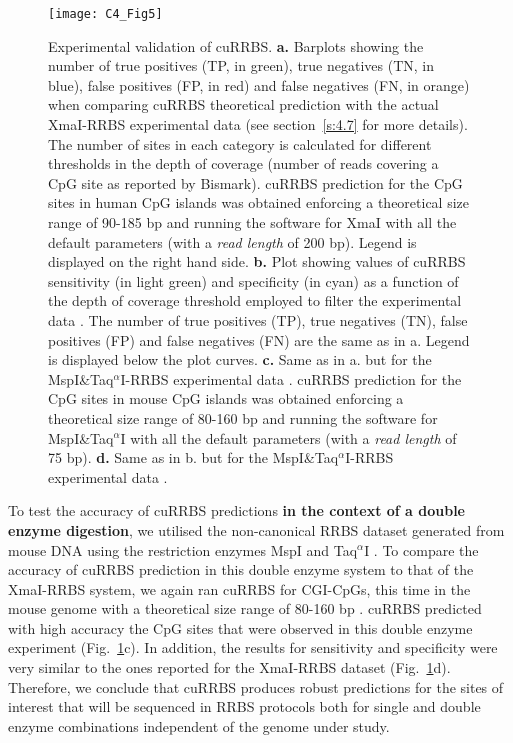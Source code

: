 \begin{figure}[htbp!] 
	\centering    
	\texttt{[image: C4\_Fig5]}
	\vspace*{2mm}
	\caption[Experimental validation of cuRRBS]{Experimental validation of cuRRBS. \textbf{a.} Barplots showing the number of true positives (\acrshort{TP}, in green), true negatives (\acrshort{TN}, in blue), false positives (\acrshort{FP}, in red) and false negatives (\acrshort{FN}, in orange) when comparing cuRRBS theoretical prediction with the actual XmaI-RRBS experimental data \cite{Tanas2017} (see section~\ref{s:4.7} for more details). The number of sites in each category is calculated for different thresholds in the depth of coverage (number of reads covering a CpG site as reported by Bismark). cuRRBS prediction for the CpG sites in human CpG islands was obtained enforcing a theoretical size range of 90-185 bp and running the software for XmaI with all the default parameters (with a \textit{read length} of 200 bp). Legend is displayed on the right hand side. \textbf{b.} Plot showing values of cuRRBS sensitivity (in light green) and specificity (in cyan) as a function of the depth of coverage threshold employed to filter the experimental data \cite{Tanas2017}. The number of true positives (TP), true negatives (TN), false positives (FP) and false negatives (FN) are the same as in a. Legend is displayed below the plot curves. \textbf{c.} Same as in a. but for the MspI\&Taq$^\alpha$I-RRBS experimental data \cite{Lim2016}. cuRRBS prediction for the CpG sites in mouse CpG islands was obtained enforcing a theoretical size range of 80-160 bp and running the software for MspI\&Taq$^\alpha$I with all the default parameters (with a \textit{read length} of 75 bp). \textbf{d.} Same as in b. but for the MspI\&Taq$^\alpha$I-RRBS experimental data \cite{Lim2016}.}
	\label{fig:c4_fig5}
\end{figure}

\bigskip

To test the accuracy of cuRRBS predictions \textbf{in the context of a double enzyme digestion}, we utilised the non-canonical RRBS dataset generated from mouse DNA using the restriction enzymes MspI and Taq$^\alpha$I \cite{Lim2016}. To compare the accuracy of cuRRBS prediction in this double enzyme system to that of the XmaI-RRBS system, we again ran cuRRBS for CGI-CpGs, this time in the mouse genome with a theoretical size range of 80-160 bp \cite{Lim2016}. cuRRBS predicted with high accuracy the CpG sites that were observed in this double enzyme experiment (Fig.~\ref{fig:c4_fig5}c). In addition, the results for sensitivity and specificity were very similar to the ones reported for the XmaI-RRBS dataset (Fig.~\ref{fig:c4_fig5}d). Therefore, we conclude that cuRRBS produces robust predictions for the sites of interest that will be sequenced in RRBS protocols both for single and double enzyme combinations independent of the genome under study.

